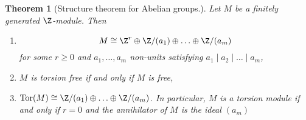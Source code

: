 \documentclass[10pt]{amsart}
\begin{document}
\newtheorem{theorem}{Theorem}
\begin{theorem}[Structure theorem for Abelian groups.]
    Let $M$ be a finitely generated $\Z$-module.  Then
    \begin{enumerate}
      \item
        $$M \cong \Z^r \oplus \Z/(a_1) \oplus \ldots \oplus \Z/(a_m)$$
        for some $r \geq 0$ and $a_1, \ldots, a_m$ non-units satisfying $a_1 \mid a_2 \mid \ldots \mid a_m$,
      \item
        $M$ is torsion free if and only if $M$ is free,
      \item
        $\operatorname{Tor}(M) \cong \Z/(a_1) \oplus \ldots \oplus \Z/(a_m)$.
        In particular, $M$ is a torsion module if and only if $r = 0$ and the annihilator of $M$ is the ideal $(a_m)$
    \end{enumerate}
\end{theorem}
\end{document}
